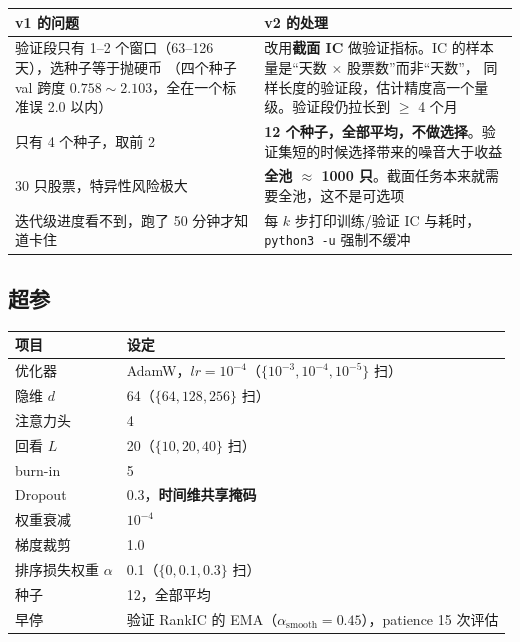 \documentclass[11pt, a4paper]{ctexart}
\newcommand{\file}[1]{\texttt{\small #1}}
\begin{document}
\begin{center}
\small
\begin{tabular}{p{4.2cm}p{10.4cm}}
\toprule
v1 的问题 & v2 的处理 \\
\midrule
验证段只有 1--2 个窗口（63--126 天），选种子等于抛硬币
（四个种子 val 跨度 $0.758\sim2.103$，全在一个标准误 2.0 以内）&
改用\textbf{截面 IC} 做验证指标。IC 的样本量是“天数 $\times$ 股票数”而非“天数”，
同样长度的验证段，估计精度高一个量级。验证段仍拉长到 $\ge$ 4 个月 \\
\midrule
只有 4 个种子，取前 2 &
\textbf{12 个种子，全部平均，不做选择}。验证集短的时候选择带来的噪音大于收益 \\
\midrule
30 只股票，特异性风险极大 &
\textbf{全池 $\approx$ 1000 只}。截面任务本来就需要全池，这不是可选项 \\
\midrule
迭代级进度看不到，跑了 50 分钟才知道卡住 &
每 $k$ 步打印训练/验证 IC 与耗时，\file{python3 -u} 强制不缓冲 \\
\bottomrule
\end{tabular}
\end{center}

\subsection{超参}

\begin{center}
\small
\begin{tabular}{ll}
\toprule
项目 & 设定 \\
\midrule
优化器 & AdamW，$lr = 10^{-4}$（$\{10^{-3},10^{-4},10^{-5}\}$ 扫） \\
隐维 $d$ & 64（$\{64,128,256\}$ 扫） \\
注意力头 & 4 \\
回看 $L$ & 20（$\{10,20,40\}$ 扫） \\
burn-in & 5 \\
Dropout & 0.3，\textbf{时间维共享掩码} \\
权重衰减 & $10^{-4}$ \\
梯度裁剪 & 1.0 \\
排序损失权重 $\alpha$ & 0.1（$\{0, 0.1, 0.3\}$ 扫） \\
种子 & 12，全部平均 \\
早停 & 验证 RankIC 的 EMA（$\alpha_{\text{smooth}}=0.45$），patience 15 次评估 \\
\bottomrule
\end{tabular}
\end{center}

\end{document}
